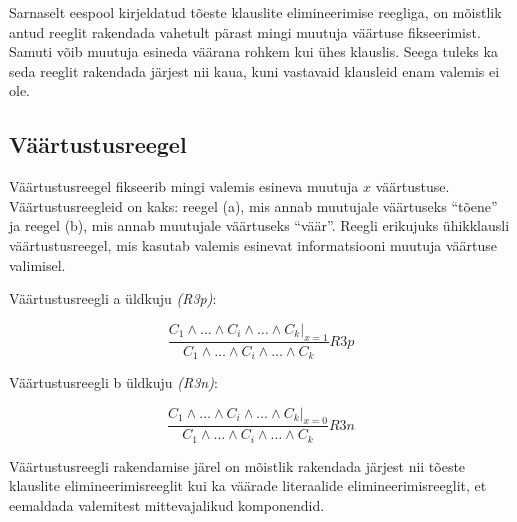 \documentclass[12pt,estonian]{report}
\begin{document}
Sarnaselt eespool kirjeldatud tõeste klauslite elimineerimise reegliga,
on mõistlik antud reeglit rakendada vahetult pärast mingi muutuja
väärtuse fikseerimist. Samuti võib muutuja esineda väärana rohkem
kui ühes klauslis. Seega tuleks ka seda reeglit rakendada järjest
nii kaua, kuni vastavaid klausleid enam valemis ei ole.


\subsection{Väärtustusreegel}

Väärtustusreegel fikseerib mingi valemis esineva muutuja $x$ väärtustuse. Väärtustusreegleid
on kaks: reegel (a), mis annab muutujale väärtuseks ``tõene'' ja
reegel (b), mis annab muutujale väärtuseks ``väär''. Reegli erikujuks
ühikklausli väärtustusreegel, mis kasutab valemis esinevat informatsiooni
muutuja väärtuse valimisel. 


Väärtustusreegli a üldkuju \emph{(R3p)}:


\[
\frac{C_{1}\wedge\dots\wedge C_{i}\wedge\dots\wedge C_{k}|_{x=1}}{C_{1}\wedge\dots\wedge C_{i}\wedge\dots\wedge C_{k}}R3p\]


Väärtustusreegli b üldkuju \emph{(R3n)}:

\[
\frac{C_{1}\wedge\dots\wedge C_{i}\wedge\dots\wedge C_{k}|_{x=0}}{C_{1}\wedge\dots\wedge C_{i}\wedge\dots\wedge C_{k}}R3n\]


Väärtustusreegli rakendamise järel on mõistlik rakendada järjest nii
tõeste klauslite elimineerimisreeglit kui ka väärade literaalide elimineerimisreeglit,
et eemaldada valemitest mittevajalikud komponendid.
\end{document}
